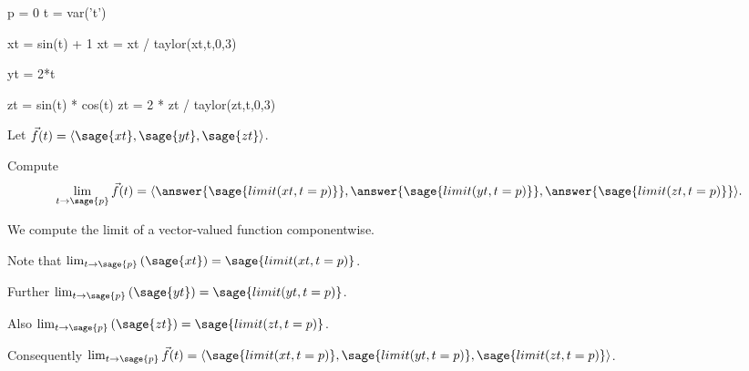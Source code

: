 \documentclass{ximera}
\author{Jim Fowler}
\begin{document}
\makerandom

\begin{sagesilent}
  p = 0
  t = var('t')
  
  xt = sin(t) + 1
  xt = xt / taylor(xt,t,0,3)
  
  yt = 2*t
  
  zt = sin(t) * cos(t)
  zt = 2 * zt / taylor(zt,t,0,3)
\end{sagesilent}

\begin{exercise}

  Let $\vec{f}(t) = \langle \sage{xt}, \sage{yt}, \sage{zt} \rangle$.

  Compute
  \[
    \lim_{t \to \sage{p}} \vec{f}(t) =
    \langle \answer{\sage{limit(xt,t=p)}}, \answer{\sage{limit(yt,t=p)}}, \answer{\sage{limit(zt,t=p)}} \rangle.
  \]
  
  \begin{hint}
    We compute the limit of a vector-valued function componentwise.
  \end{hint}

  \begin{hint}
    Note that $\lim_{t \to \sage{p}} \left( \sage{xt} \right) = \sage{limit(xt,t=p)}$.
  \end{hint}

  \begin{hint}
    Further $\lim_{t \to \sage{p}} \left( \sage{yt} \right) = \sage{limit(yt,t=p)}$.
  \end{hint}

  \begin{hint}
    Also $\lim_{t \to \sage{p}} \left( \sage{zt} \right) = \sage{limit(zt,t=p)}$.
  \end{hint}
  
  \begin{hint}
    Consequently $\lim_{t \to \sage{p}} \vec{f}(t) = \langle \sage{limit(xt,t=p)}, \sage{limit(yt,t=p)}, \sage{limit(zt,t=p)} \rangle$.
  \end{hint}          
  
\end{exercise}
\end{document}
